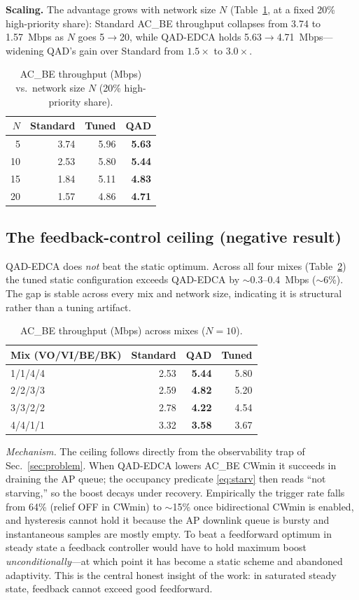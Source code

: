 \documentclass[conference]{IEEEtran}
\newcommand{\AC}[1]{AC\_#1}
\begin{document}
\textbf{Scaling.} The advantage grows with network size $N$
(Table~\ref{tab:nscale}, at a fixed 20\% high-priority share): Standard \AC{BE}
throughput collapses from 3.74 to 1.57~Mbps as $N$ goes 5$\to$20, while
QAD-EDCA holds 5.63$\to$4.71~Mbps---widening QAD's gain over Standard from
$1.5\times$ to $3.0\times$.

\begin{table}[t]
\centering
\caption{\AC{BE} throughput (Mbps) vs.\ network size $N$ (20\% high-priority share).}
\label{tab:nscale}
\begin{tabular}{@{}rrrr@{}}
\toprule
$N$ & Standard & Tuned & \textbf{QAD}\\
\midrule
5  & 3.74 & 5.96 & \textbf{5.63}\\
10 & 2.53 & 5.80 & \textbf{5.44}\\
15 & 1.84 & 5.11 & \textbf{4.83}\\
20 & 1.57 & 4.86 & \textbf{4.71}\\
\bottomrule
\end{tabular}
\end{table}

\subsection{The feedback-control ceiling (negative result)}
QAD-EDCA does \emph{not} beat the static optimum. Across all four mixes
(Table~\ref{tab:mixes}) the tuned static configuration exceeds QAD-EDCA by
$\sim$0.3--0.4~Mbps ($\sim$6\%). The gap is stable across every mix and network
size, indicating it is structural rather than a tuning artifact.

\begin{table}[t]
\centering
\caption{\AC{BE} throughput (Mbps) across mixes ($N{=}10$).}
\label{tab:mixes}
\begin{tabular}{@{}lrrr@{}}
\toprule
Mix (VO/VI/BE/BK) & Standard & \textbf{QAD} & Tuned\\
\midrule
1/1/4/4 & 2.53 & \textbf{5.44} & 5.80\\
2/2/3/3 & 2.59 & \textbf{4.82} & 5.20\\
3/3/2/2 & 2.78 & \textbf{4.22} & 4.54\\
4/4/1/1 & 3.32 & \textbf{3.58} & 3.67\\
\bottomrule
\end{tabular}
\end{table}

\emph{Mechanism.} The ceiling follows directly from the observability trap of
Sec.~\ref{sec:problem}. When QAD-EDCA lowers \AC{BE} CWmin it succeeds in
draining the AP queue; the occupancy predicate \eqref{eq:starv} then reads
``not starving,'' so the boost decays under recovery. Empirically the trigger
rate falls from 64\% (relief OFF in CWmin) to $\sim$15\% once bidirectional
CWmin is enabled, and hysteresis cannot hold it because the AP downlink queue
is bursty and instantaneous samples are mostly empty. To beat a feedforward
optimum in steady state a feedback controller would have to hold maximum boost
\emph{unconditionally}---at which point it has become a static scheme and
abandoned adaptivity. This is the central honest insight of the work: in
saturated steady state, feedback cannot exceed good feedforward.
\end{document}
